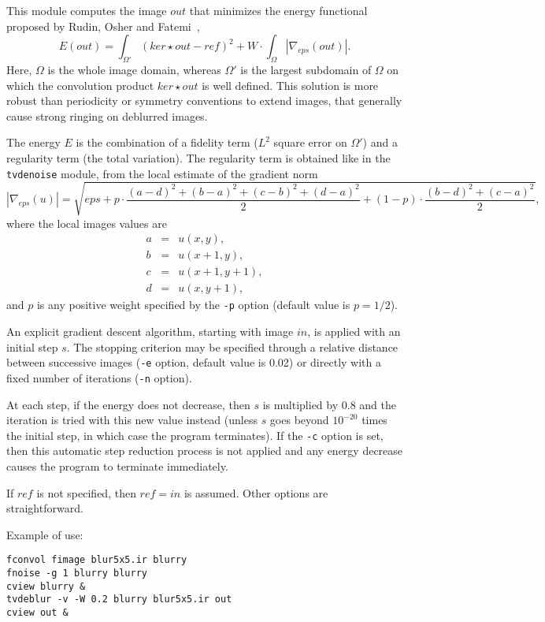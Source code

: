 This module computes the image $out$ that minimizes the energy
functional proposed by Rudin, Osher and 
Fatemi~\cite{rudin.osher.ea:nonlinear}\cite{rudin.osher:total},
$$E(out) = \int_{\Omega'} (ker \star out -ref)^2
+ W \cdot \int_{\Omega} |\nabla_{eps}(out)|.$$
Here, $\Omega$ is the whole image domain, whereas $\Omega'$ is the
largest subdomain of $\Omega$ on which the convolution product $ker \star out$
is well defined. This solution is more robust than periodicity or symmetry
conventions to extend images, that generally cause strong ringing on deblurred
images.

\medskip

The energy $E$ is the combination of a fidelity term ($L^2$ square error on 
$\Omega'$) and a regularity term (the total 
variation).
The regularity term is obtained like in the \verb+tvdenoise+ module, 
from the local estimate of the gradient norm
$$|\nabla_{eps}(u)| = \sqrt{eps + p \cdot 
\frac{\displaystyle (a-d)^2+(b-a)^2+(c-b)^2+(d-a)^2}2
+ (1-p)\cdot \frac{\displaystyle (b-d)^2+(c-a)^2}2},$$
where the local images values are 
\begin{eqnarray*}
a &=& u(x,y), \\
b &=& u(x+1,y), \\
c &=& u(x+1,y+1), \\
d &=& u(x,y+1),
\end{eqnarray*}
and $p$ is any positive weight specified by the \verb+-p+ option (default
value is $p=1/2$).

\medskip

An explicit 
gradient descent algorithm, starting with image $in$, is applied with an 
initial step $s$.
The stopping criterion may be specified through a relative distance
between successive images (\verb+-e+ option, default value is 0.02)
or directly with a fixed number of iterations (\verb+-n+ option).

\medskip

At each step, if the energy does not decrease, then $s$ is multiplied by
$0.8$ and the iteration is tried with this new value instead (unless
$s$ goes beyond $10^{-20}$ times the initial step, in which case the
program terminates). If the \verb+-c+ option is set, then this automatic
step reduction process is not applied and any energy decrease
causes the program to terminate immediately.

\medskip

If $ref$ is not specified, then $ref=in$ is assumed. 
Other options are straightforward.

\medskip

Example of use:
\begin{verbatim}
fconvol fimage blur5x5.ir blurry
fnoise -g 1 blurry blurry
cview blurry &
tvdeblur -v -W 0.2 blurry blur5x5.ir out
cview out &
\end{verbatim}
